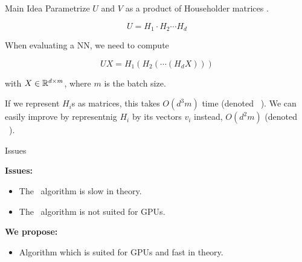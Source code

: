 \begin{frame}{Main Idea}
	Parametrize $U$ and $V$ as a product of Householder matrices \cite{orthhh}.
	
	$$
		U = H_1 \cdot H_2 \cdots H_{d}
	$$

	When evaluating a NN, we need to compute

	$$
		UX = H_1 ( H_2 ( \cdots (H_{d} X)))
	$$

	with $X \in \mathbb{R}^{d \times m}$, where $m$ is the batch size.

	If we represent $H_i$s as matrices, this takes $O(d^3m)$ time (denoted \myparallel~\cite{orthhh}).
	We can easily improve by representnig $H_i$ by its vectors
	$v_i$ instead, $O(d^2m)$ (denoted \mysequential~\cite{orthhh}).
\end{frame}

\begin{frame}{Issues}
	
	\textbf{Issues:}
	\begin{itemize}
		\item The \myparallel~algorithm is slow in theory.
		\item The \mysequential~algorithm is not suited for GPUs.
	\end{itemize}

	\textbf{We propose:}
	\begin{itemize}
		\item Algorithm which is suited for GPUs and fast in theory.
	\end{itemize}

\end{frame}

